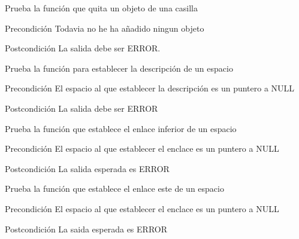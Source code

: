 \begin{DoxyRefList}
\item[\label{test__test000308}%
\hypertarget{test__test000308}{}%
Global \hyperlink{space__test_8c_a8f53f80be6eeff3b6e2fd0ce6b6ea310}{test2\-\_\-space\-\_\-remove\-\_\-object} ()]Prueba la función que quita un objeto de una casilla \begin{DoxyPrecond}{Precondición}
Todavia no he ha añadido ningun objeto 
\end{DoxyPrecond}
\begin{DoxyPostcond}{Postcondición}
La salida debe ser E\-R\-R\-O\-R.  
\end{DoxyPostcond}

\item[\label{test__test000246}%
\hypertarget{test__test000246}{}%
Global \hyperlink{space__test_8c_ab3dd07cbead60f87866e2bd2c426da0f}{test2\-\_\-space\-\_\-set\-\_\-description} ()]Prueba la función para establecer la descripción de un espacio \begin{DoxyPrecond}{Precondición}
El espacio al que establecer la descripción es un puntero a N\-U\-L\-L 
\end{DoxyPrecond}
\begin{DoxyPostcond}{Postcondición}
La salida debe ser E\-R\-R\-O\-R  
\end{DoxyPostcond}

\item[\label{test__test000269}%
\hypertarget{test__test000269}{}%
Global \hyperlink{space__test_8c_a4d579ee19e22dfc43891f0dca5db14a6}{test2\-\_\-space\-\_\-set\-\_\-down} ()]Prueba la función que establece el enlace inferior de un espacio \begin{DoxyPrecond}{Precondición}
El espacio al que establecer el enclace es un puntero a N\-U\-L\-L 
\end{DoxyPrecond}
\begin{DoxyPostcond}{Postcondición}
La salida esperada es E\-R\-R\-O\-R  
\end{DoxyPostcond}

\item[\label{test__test000260}%
\hypertarget{test__test000260}{}%
Global \hyperlink{space__test_8c_a5df66d103388be4518c379b224f53770}{test2\-\_\-space\-\_\-set\-\_\-east} ()]Prueba la función que establece el enlace este de un espacio \begin{DoxyPrecond}{Precondición}
El espacio al que establecer el enclace es un puntero a N\-U\-L\-L 
\end{DoxyPrecond}
\begin{DoxyPostcond}{Postcondición}
La saida esperada es E\-R\-R\-O\-R  
\end{DoxyPostcond}


\end{DoxyRefList}
